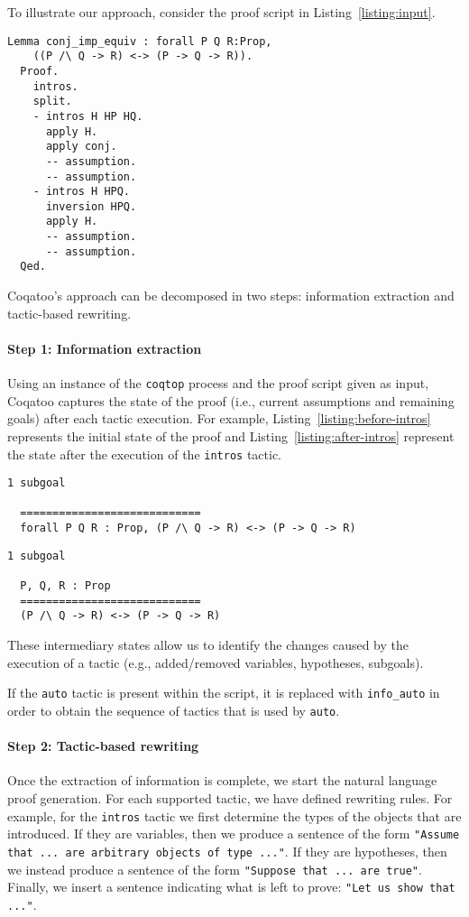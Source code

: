 \documentclass[sigplan,9pt]{acmart}\settopmatter{printfolios=true,printccs=false,printacmref=false}
\begin{document}
To illustrate our approach, consider the proof script in Listing~\ref{listing:input}.
\begin{lstlisting}[label=listing:input,captionpos=b,caption=Input]
  Lemma conj_imp_equiv : forall P Q R:Prop, 
    ((P /\ Q -> R) <-> (P -> Q -> R)).
  Proof.
    intros.
    split.
    - intros H HP HQ.
      apply H.
      apply conj.
      -- assumption.
      -- assumption.
    - intros H HPQ.
      inversion HPQ.
      apply H.
      -- assumption.
      -- assumption.
  Qed.
\end{lstlisting}

Coqatoo's approach can be decomposed in two steps: information extraction and tactic-based rewriting. 

\paragraph{Step 1: Information extraction}
Using an instance of the \texttt{coqtop} process and the proof script given as input, Coqatoo captures the state of the proof (i.e., current assumptions and remaining goals) after each tactic execution. For example, Listing~\ref{listing:before-intros} represents the initial state of the proof and Listing~\ref{listing:after-intros} represent the state after the execution of the \lstinline{intros} tactic.
\begin{lstlisting}[label=listing:before-intros, captionpos=b,caption={State before executing the first intros tactic}]
  1 subgoal
  
  ============================
  forall P Q R : Prop, (P /\ Q -> R) <-> (P -> Q -> R)
\end{lstlisting}

\begin{lstlisting}[label=listing:after-intros,captionpos=b,caption={State after executing the first intros tactic}]
  1 subgoal
  
  P, Q, R : Prop
  ============================
  (P /\ Q -> R) <-> (P -> Q -> R)
\end{lstlisting}
These intermediary states allow us to identify the changes caused by the execution of a tactic (e.g., added/removed variables, hypotheses, subgoals).

If the \lstinline{auto} tactic is present within the script, it is replaced with \lstinline{info_auto} in order to obtain the sequence of tactics that is used by \lstinline{auto}.

\paragraph{Step 2: Tactic-based rewriting}
Once the extraction of information is complete, we start the natural language proof generation. For each supported tactic, we have defined rewriting rules. For example, for the \lstinline{intros} tactic we first determine the types of the objects that are introduced. If they are variables, then we produce a sentence of the form \lstinline{"Assume that ... are arbitrary objects of type ..."}. If they are hypotheses, then we instead produce a sentence of the form \lstinline{"Suppose that ... are true"}. Finally, we insert a sentence indicating what is left to prove: \lstinline{"Let us show that ..."}. 
\end{document}
